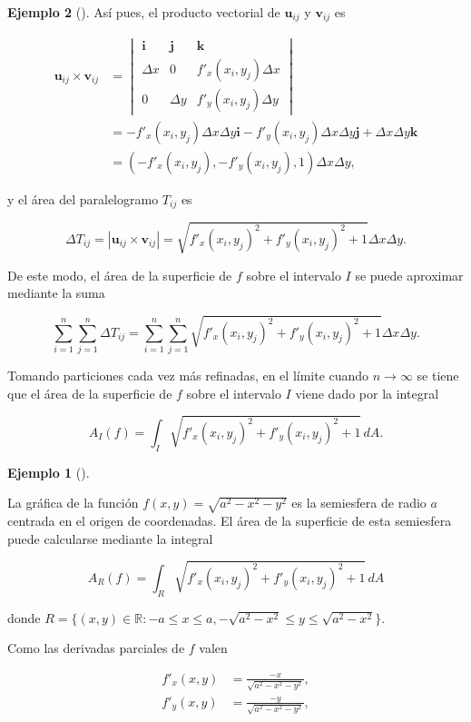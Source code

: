 \documentclass[
  a4paper,
]{scrreport}
\theoremstyle{definition}
\newtheorem{example}{Ejemplo}[chapter]
\theoremstyle{plain}
\theoremstyle{definition}
\theoremstyle{definition}
\theoremstyle{plain}
\theoremstyle{plain}
\theoremstyle{remark}
\begin{document}
\begin{example}[]
Así pues, el producto vectorial de \(\mathbf{u}_{ij}\) y
\(\mathbf{v}_{ij}\) es

\begin{align*}
\mathbf{u}_{ij}\times\mathbf{v}_{ij} 
&= 
\begin{vmatrix}
\mathbf{i} & \mathbf{j} & \mathbf{k} \\
\Delta x & 0 & f'_x(x_i,y_j)\Delta x \\
0 & \Delta y & f'_y(x_i,y_j)\Delta y
\end{vmatrix} \\
&= -f'_x(x_i,y_j)\Delta x\Delta y \mathbf{i} -f'_y(x_i,y_j)\Delta x\Delta y \mathbf{j} + \Delta x\Delta y \mathbf{k} \\
&= (-f'_x(x_i,y_j), -f'_y(x_i,y_j), 1)\Delta x\Delta y,
\end{align*}

y el área del paralelogramo \(T_{ij}\) es

\[
\Delta T_{ij} 
= |\mathbf{u}_{ij}\times\mathbf{v}_{ij}| 
= \sqrt{f'_x(x_i,y_j)^2 + f'_y(x_i,y_j)^2 + 1}\Delta x\Delta y.
\]

De este modo, el área de la superficie de \(f\) sobre el intervalo \(I\)
se puede aproximar mediante la suma

\[
\sum_{i=1}^n\sum_{j=1}^n \Delta T_{ij} 
= \sum_{i=1}^n\sum_{j=1}^n \sqrt{f'_x(x_i,y_j)^2 + f'_y(x_i,y_j)^2 + 1}\Delta x\Delta y.
\]

Tomando particiones cada vez más refinadas, en el límite cuando
\(n\to \infty\) se tiene que el área de la superficie de \(f\) sobre el
intervalo \(I\) viene dado por la integral

\[
A_I(f) = \int_I \sqrt{f'_x(x_i,y_j)^2 + f'_y(x_i,y_j)^2 + 1}\,dA.
\]

\begin{example}[]\protect\hypertarget{exm-área-superficie-semi-esfera}{}\label{exm-área-superficie-semi-esfera}

La gráfica de la función \(f(x,y)=\sqrt{a^2-x^2-y^2}\) es la semiesfera
de radio \(a\) centrada en el origen de coordenadas. El área de la
superficie de esta semiesfera puede calcularse mediante la integral

\[
A_R(f) = \int_R \sqrt{f'_x(x_i,y_j)^2 + f'_y(x_i,y_j)^2 + 1}\,dA
\]

donde
\(R=\{(x,y)\in \mathbb{R}: -a\leq x\leq a, -\sqrt{a^2-x^2}\leq y\leq \sqrt{a^2-x^2}\}\).

Como las derivadas parciales de \(f\) valen

\begin{align*}
f'_x(x,y) &= \frac{-x}{\sqrt{a^2-x^2-y^2}}, \\
f'_y(x,y) &= \frac{-y}{\sqrt{a^2-x^2-y^2}},
\end{align*}


\end{example}
\end{example}
\end{document}
